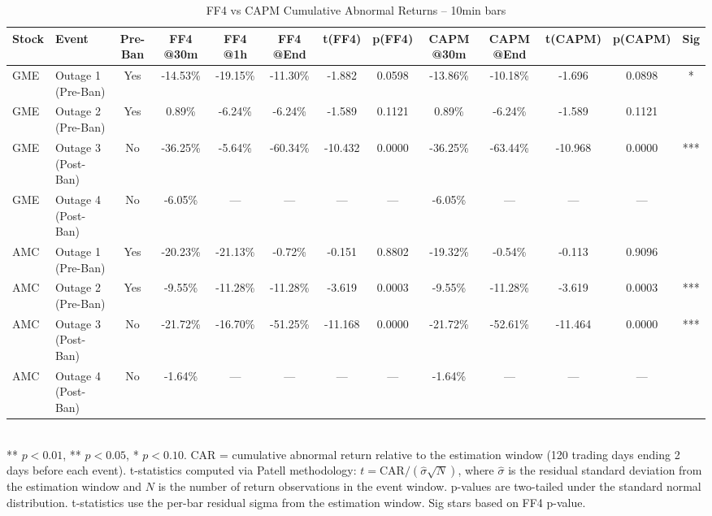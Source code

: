 \begin{table}[htbp]
  \centering
  \caption{FF4 vs CAPM Cumulative Abnormal Returns -- 10min bars}
  \label{tab:multifreq_10min}
  \begin{tabular}{llccccccccccc}
    \hline\hline
    Stock & Event & Pre-Ban & FF4 @30m & FF4 @1h & FF4 @End & t(FF4) & p(FF4) & CAPM @30m & CAPM @End & t(CAPM) & p(CAPM) & Sig \\
    \hline
    GME & Outage 1 (Pre-Ban) & Yes & -14.53\% & -19.15\% & -11.30\% & -1.882 & 0.0598 & -13.86\% & -10.18\% & -1.696 & 0.0898 & * \\
    GME & Outage 2 (Pre-Ban) & Yes & 0.89\% & -6.24\% & -6.24\% & -1.589 & 0.1121 & 0.89\% & -6.24\% & -1.589 & 0.1121 &  \\
    GME & Outage 3 (Post-Ban) & No & -36.25\% & -5.64\% & -60.34\% & -10.432 & 0.0000 & -36.25\% & -63.44\% & -10.968 & 0.0000 & *** \\
    GME & Outage 4 (Post-Ban) & No & -6.05\% & — & — & — & — & -6.05\% & — & — & — &  \\
    \hline
    AMC & Outage 1 (Pre-Ban) & Yes & -20.23\% & -21.13\% & -0.72\% & -0.151 & 0.8802 & -19.32\% & -0.54\% & -0.113 & 0.9096 &  \\
    AMC & Outage 2 (Pre-Ban) & Yes & -9.55\% & -11.28\% & -11.28\% & -3.619 & 0.0003 & -9.55\% & -11.28\% & -3.619 & 0.0003 & *** \\
    AMC & Outage 3 (Post-Ban) & No & -21.72\% & -16.70\% & -51.25\% & -11.168 & 0.0000 & -21.72\% & -52.61\% & -11.464 & 0.0000 & *** \\
    AMC & Outage 4 (Post-Ban) & No & -1.64\% & — & — & — & — & -1.64\% & — & — & — &  \\
    \hline\hline
  \end{tabular}
  \\[4pt]
  {\small *** $p<0.01$, ** $p<0.05$, * $p<0.10$. CAR = cumulative abnormal return relative to the estimation window (120 trading days ending 2 days before each event). t-statistics computed via Patell methodology: $t = \text{CAR} / (\hat{\sigma} \sqrt{N})$, where $\hat{\sigma}$ is the residual standard deviation from the estimation window and $N$ is the number of return observations in the event window. p-values are two-tailed under the standard normal distribution. t-statistics use the per-bar residual sigma from the estimation window. Sig stars based on FF4 p-value.}
\end{table}
